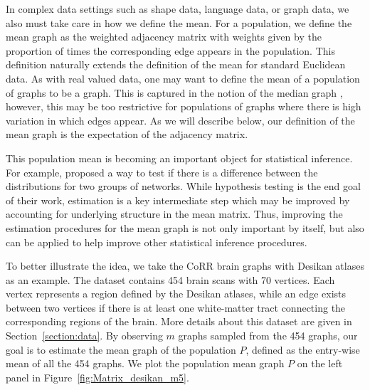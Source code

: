 In complex data settings such as shape data, language data, or graph data, we also must take care in how we define the mean.
For a population, we define the mean graph as the weighted adjacency matrix with weights given by the proportion of times the corresponding edge appears in the population. 
This definition naturally extends the definition of the mean for standard Euclidean data.
As with real valued data, one may want to define the mean of a population of graphs to be a graph.
This is captured in the notion of the median graph \citep{jiang2001median}, however, this may be too restrictive for populations of graphs where there is high variation in which edges appear. 
As we will describe below, our definition of the mean graph is the expectation of the adjacency matrix.

This population mean is becoming an important object for statistical inference.
For example, \citet{ginestet2014hypothesis} proposed a way to test if there is a difference between the distributions for two groups of networks.  
While hypothesis testing is the end goal of their work, estimation is a key intermediate step which may be improved by accounting for underlying structure in the mean matrix. 
Thus, improving the estimation procedures for the mean graph is not only important by itself, but also can be applied to help improve other statistical inference procedures.

To better illustrate the idea, we take the CoRR brain graphs with Desikan atlases as an example. The dataset contains 454 brain scans with 70 vertices. Each vertex represents a region defined by the Desikan atlases, while an edge exists between two vertices if there is at least one white-matter tract connecting the corresponding regions of the brain. More details about this dataset are given in Section~\ref{section:data}. By observing $m$ graphs sampled from the 454 graphs, our goal is to estimate the mean graph of the population $P$, defined as the entry-wise mean of all the 454 graphs. We plot the population mean graph $P$ on the left panel in Figure~\ref{fig:Matrix_desikan_m5}.


